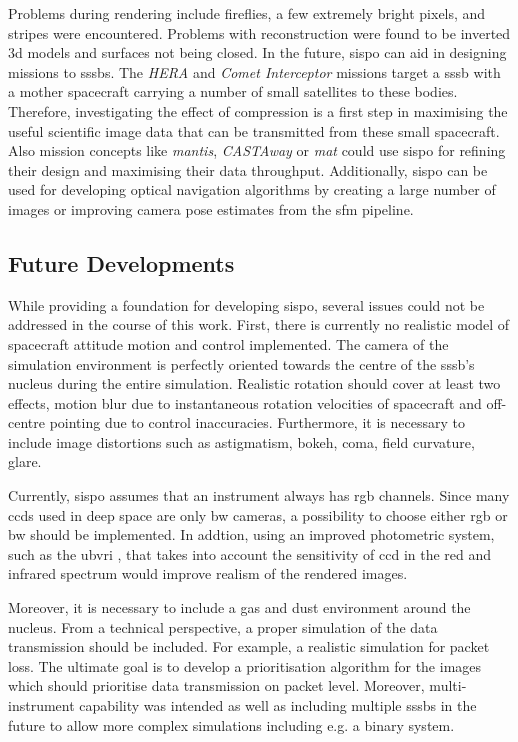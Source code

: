 Problems during rendering include fireflies, a few extremely bright pixels, and stripes were encountered.
Problems with reconstruction were found to be inverted \gls{3d} models and surfaces not being closed.
In the future, \gls{sispo} can aid in designing missions to \glspl{sssb}. The \textit{HERA} and \textit{Comet Interceptor} missions target a \gls{sssb} with a mother spacecraft carrying a number of small satellites to these bodies. Therefore, investigating the effect of compression is a first step in maximising the useful scientific image data that can be transmitted from these small spacecraft. Also mission concepts like \textit{\gls{mantis}}, \textit{CASTAway} or \textit{\gls{mat}} could use \gls{sispo} for refining their design and maximising their data throughput. Additionally, \gls{sispo} can be used for developing optical navigation algorithms by creating a large number of images or improving camera pose estimates from the \gls{sfm} pipeline.

\subsection{Future Developments}
While providing a foundation for developing \gls{sispo}, several issues could not be addressed in the course of this work.
First, there is currently no realistic model of spacecraft attitude motion and control implemented. The camera of the simulation environment is perfectly oriented towards the centre of the \gls{sssb}'s nucleus during the entire simulation. Realistic rotation should cover at least two effects, motion blur due to instantaneous rotation velocities of spacecraft and off-centre pointing due to control inaccuracies. Furthermore, it is necessary to include image distortions such as astigmatism, bokeh, coma, field curvature, glare.

Currently, \gls{sispo} assumes that an instrument always has \gls{rgb} channels. Since many \gls{ccd}s used in deep space are only \gls{bw} cameras, a possibility to choose either \gls{rgb} or \gls{bw} should be implemented. In addtion, using an improved photometric system, such as the \gls{ubvri} \cite{Bessell1993PhotometricSystems}, that takes into account the sensitivity of \gls{ccd} in the red and infrared spectrum would improve realism of the rendered images.

Moreover, it is necessary to include a gas and dust environment around the nucleus. From a technical perspective, a proper simulation of the data transmission should be included. For example, a realistic simulation for packet loss. The ultimate goal is to develop a prioritisation algorithm for the images which should prioritise data transmission on packet level.
Moreover, multi-instrument capability was intended as well as including multiple \gls{sssb}s in the future to allow more complex simulations including e.g. a binary system.


